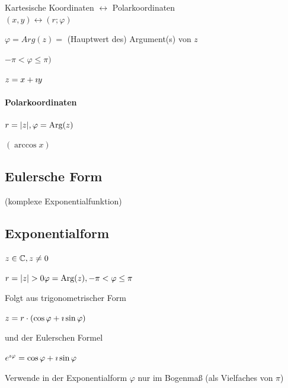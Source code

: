 Kartesische Koordinaten $\leftrightarrow$ Polarkoordinaten\\
$(x,y) \leftrightarrow (r;\varphi)$



$\varphi = Arg(z) = $ (Hauptwert des) Argument(s) von $z$

$-\pi<\varphi\leq\pi)$

$z = x+\imath y$

\paragraph{Polarkoordinaten}
$r=|z|, \varphi=\mathbin\text{Arg}(z)$

\Bem $(\arccos x)$


\clearpage
\subsection{Eulersche Form}
\qquad (komplexe Exponentialfunktion)

\subsection{Exponentialform}
$z\in\mathbb{C}, z\ne0$

 \qquad\parbox{5cm}{$r=|z|>0\\\varphi=\Arg(z),-\pi<\varphi\leq\pi$}

Folgt aus trigonometrischer Form

$z=r\cdot(\cos\varphi+\imath \sin\varphi)$

und der Eulerschen Formel

$e^{\imath \varphi}=\cos\varphi+\imath \sin\varphi$

\Bem Verwende in der Exponentialform $\varphi$ nur im Bogenmaß (als Vielfaches von $\pi$)

